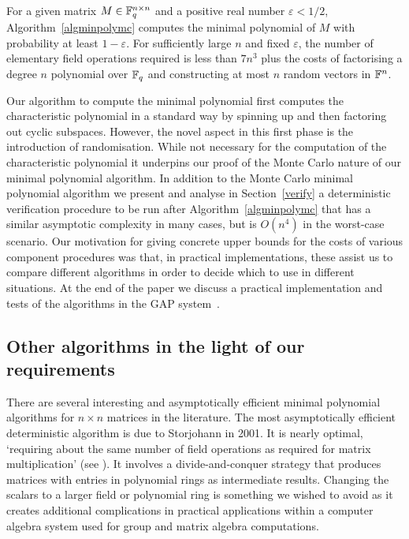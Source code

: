 \begin{Theo}\label{main}
For a given matrix $M \in \mathbb{F}_q^{n \times n}$ and a positive 
real number $\varepsilon < 1/2$, Algorithm~\ref{algminpolymc}
computes the minimal polynomial of $M$ with probability at least $1-\varepsilon$.
For sufficiently large $n$ and fixed $\varepsilon$, the number of elementary 
field operations required is less than $7n^3$ plus the costs of 
factorising a degree $n$ polynomial over $\mathbb{F}_q$ and constructing at most $n$
random vectors in $\mathbb{F}^n$.
\end{Theo}


Our algorithm to compute the minimal polynomial first computes the
characteristic polynomial in a standard way by spinning up and then
factoring out cyclic
subspaces. However, the novel aspect in this first phase
is the introduction of randomisation. While
not necessary for the computation of the characteristic polynomial
it underpins our proof of the Monte Carlo 
nature of our minimal polynomial algorithm. In addition to the Monte Carlo
minimal polynomial algorithm
we present and analyse in Section~\ref{verify} a deterministic
verification procedure to
be run after Algorithm~\ref{algminpolymc} that has a similar asymptotic
complexity in many cases, but is $O(n^4)$ in the worst-case scenario.
Our motivation for giving concrete upper bounds for the costs of 
various component procedures was that, in practical implementations, 
these assist us to compare different algorithms in order to 
decide which to use in different situations. At the end of the paper we discuss
a practical implementation and tests of the algorithms in the {\sf GAP}
system~\cite{GAP4}.

\subsection{Other algorithms in the light of our requirements}

There are several interesting and asymptotically efficient
minimal polynomial algorithms for $n\times n$ matrices in the literature. The most  
asymptotically efficient deterministic algorithm is due to Storjohann 
\cite{Stor01} in 2001. It is nearly optimal, `requiring about the same number of 
field operations as required for matrix 
multiplication' (see \cite[Abstract, p368]{Stor01}). 
It involves a divide-and-conquer strategy that produces matrices 
with entries in polynomial rings as intermediate results. 
Changing the scalars to a larger field or polynomial ring is 
something we wished to avoid as it creates additional complications in practical 
applications within a computer algebra system used for group and 
matrix algebra computations.

